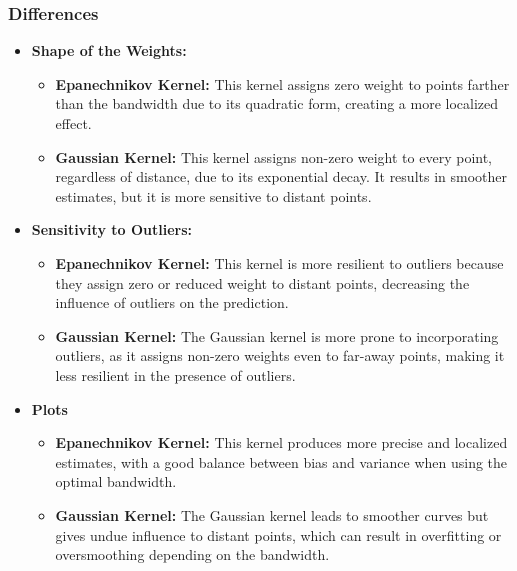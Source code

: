 \subsubsection{Differences}
\begin{itemize}
	\item \textbf{Shape of the Weights:}
	      \begin{itemize}
		      \item \textbf{Epanechnikov Kernel:} This kernel assigns zero weight to points farther than the bandwidth due to its quadratic form, creating a more localized effect.
		      \item \textbf{Gaussian Kernel:} This kernel assigns non-zero weight to every point, regardless of distance, due to its exponential decay. It results in smoother estimates, but it is more sensitive to distant points.
	      \end{itemize}

	\item \textbf{Sensitivity to Outliers:}
	      \begin{itemize}
		      \item \textbf{Epanechnikov Kernel:} This kernel is more resilient to outliers because they assign zero or reduced weight to distant points, decreasing the influence of outliers on the prediction.
		      \item \textbf{Gaussian Kernel:} The Gaussian kernel is more prone to incorporating outliers, as it assigns non-zero weights even to far-away points, making it less resilient in the presence of outliers.
	      \end{itemize}
	\item \textbf{Plots}
	      \begin{itemize}
		      \item \textbf{Epanechnikov Kernel:} This kernel produces more precise and localized estimates, with a good balance between bias and variance when using the optimal bandwidth.
		      \item \textbf{Gaussian Kernel:} The Gaussian kernel leads to smoother curves but gives undue influence to distant points, which can result in overfitting or oversmoothing depending on the bandwidth.
	      \end{itemize}
\end{itemize}
